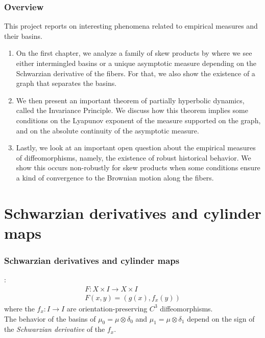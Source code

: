 \documentclass[shortlabels, 9pt, aspectratio=2013]{beamer}
\begin{document}
\begin{frame}
  \frametitle{Overview}
  This project reports on interesting phenomena related to empirical measures and their basins.\\[1em]
  \begin{enumerate}
  \item On the first chapter, we analyze a family of skew products by \textcite{bonifantSchwarzianDerivativesCylinder2008} where we see either intermingled basins or a unique asymptotic measure depending on the Schwarzian derivative of the fibers. For that, we also show the existence of a graph that separates the basins.
  \item We then present an important theorem of partially hyperbolic dynamics, called the Invariance Principle. We discuss how this theorem implies some conditions on the Lyapunov exponent of the measure supported on the graph, and on the absolute continuity of the asymptotic measure.
  \item Lastly, we look at an important open question about the empirical measures of diffeomorphisms, namely, the existence of robust historical behavior. We show this occurs non-robustly for skew products when some conditions ensure a kind of convergence to the Brownian motion along the fibers.
  \end{enumerate}
\end{frame}

\section{Schwarzian derivatives and cylinder maps}

\begin{frame}
  \frametitle{Schwarzian derivatives and cylinder maps}
  \textcite{bonifantSchwarzianDerivativesCylinder2008}:
  \begin{gather*}
    F \colon X \times I \to X \times I\\
    F(x,y) = (g(x), f_x(y))
  \end{gather*}
  where the \(f_x \colon I \to I\) are orientation-preserving \(C^3\) diffeomorphisms.\\[1em]

  The behavior of the basins of \(\mu_0 = \mu \otimes \delta_0\) and \(\mu_1 = \mu \otimes \delta_1\) depend on the sign of the \emph{Schwarzian derivative} of the \(f_x\).
\end{frame}
\end{document}
